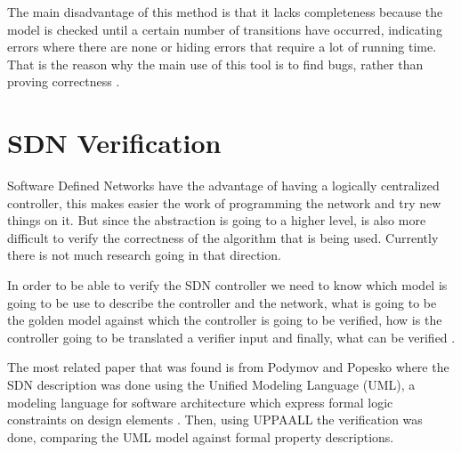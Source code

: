 The main disadvantage of this method is that it lacks completeness because the model is checked until a certain number of transitions have occurred, indicating errors where there are none or hiding errors that require a lot of running time. That is the reason why the main use of this tool is to find bugs, rather than proving correctness \cite{clarke2001bounded}.


\section{SDN Verification}
%

Software Defined Networks have the advantage of having a logically centralized controller, this makes easier the work of programming the network and try new things on it. But since the abstraction is going to a higher level, is also more difficult to verify the correctness of the algorithm that is being used. Currently there is not much research going in that direction.

In order to be able to verify the SDN controller we need to know which model is going to be use to describe the controller and the network, what is going to be the golden model against which the controller is going to be verified, how is the controller going to be translated a verifier input and finally, what can be verified \cite{podymov2013uppaal}.

The most related paper that was found is from Podymov and Popesko \cite{podymov2013uppaal} where the SDN description was done using the Unified Modeling Language (UML), a modeling language for software architecture which express formal logic constraints on design elements \cite{medvidovic2002modeling}. Then, using UPPAALL \cite{larsen1997uppaal} the verification was done, comparing the UML model against formal property descriptions.

